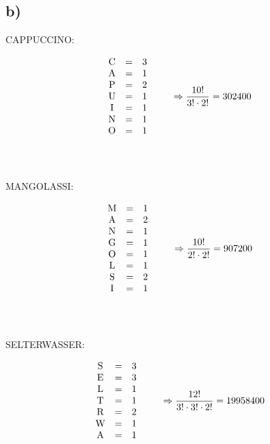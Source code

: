 \documentclass[a4paper]{scrartcl}
\begin{document}
	\subsection{b)}
		\begin{center}
			CAPPUCCINO: \\
		\end{center}
		\[		
		\begin{array}{ccc}
			\text{C}&=& 3 \\
			\text{A}&=& 1 \\
			\text{P}&=& 2 \\
			\text{U}&=& 1 \\
			\text{I}&=& 1 \\
			\text{N}&=& 1 \\
			\text{O}&=& 1 \\
		\end{array}
		\quad\quad\Rightarrow \frac{10!}{3!\cdot 2!}=302400 \\
		\] \\ \\
		\begin{center}
			MANGOLASSI: \\
		\end{center}
		\[
		\begin{array}{ccc}
			\text{M}&=& 1 \\
			\text{A}&=& 2 \\
			\text{N}&=& 1 \\
			\text{G}&=& 1 \\
			\text{O}&=& 1 \\
			\text{L}&=& 1 \\
			\text{S}&=& 2 \\
			\text{I}&=& 1 \\
		\end{array}
		\quad\quad\Rightarrow \frac{10!}{2!\cdot 2!}=907200 \\
		\] \\ \\
		\begin{center}
			SELTERWASSER: \\
		\end{center}
		\[
		\begin{array}{ccc}
			\text{S}&=& 3 \\
			\text{E}&=& 3 \\
			\text{L}&=& 1 \\
			\text{T}&=& 1 \\
			\text{R}&=& 2 \\
			\text{W}&=& 1 \\
			\text{A}&=& 1 \\
		\end{array}
		\quad\quad\Rightarrow \frac{12!}{3!\cdot 3!\cdot 2!}=19958400 \\
		\]
\end{document}
